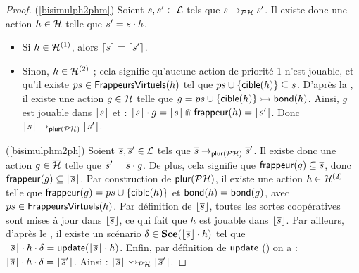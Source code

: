 \begin{proof}
  (\ref{bisimulph2phm}) Soient $s, s' \in \mathcal{L}$ tels que $s \rightarrow_{\mathcal{PH}} s'$.
    Il existe donc une action $h \in \mathcal{H}$ telle que $s' = s \cdot h$.
    \begin{itemize}
      \item Si $h \in \mathcal{H}^{(1)}$, alors $\lceil s \rceil = \lceil s' \rceil$.
      \item Sinon, $h \in \mathcal{H}^{(2)}$ ; cela signifie qu'aucune action de priorité 1 n'est
        jouable, et qu'il existe $ps \in \mathsf{FrappeursVirtuels}(h)$ tel que
        $ps \cup \{ \mathsf{cible}(h) \} \subseteq s$.
        D'après la , il existe une action $g \in \overline{\mathcal{H}}$
        telle que $g = \mbox{$ps \cup \{ \mathsf{cible}(h) \} \rightarrowtail \mathsf{bond}(h)$}$.
        Ainsi, $g$ est jouable dans $\lceil s \rceil$ et :
        $\lceil s \rceil \cdot g = \lceil s \rceil \Cap \mathsf{frappeur}(h) = \lceil s' \rceil$.
        Donc $\lceil s \rceil \rightarrow_{\mathsf{plur}(\mathcal{PH})} \lceil s' \rceil$.
    \end{itemize}
    
  (\ref{bisimulphm2ph}) Soient $\overline{s}, \overline{s}' \in \overline{\mathcal{L}}$ tels que $\overline{s} \rightarrow_{\mathsf{plur}(\mathcal{PH})} \overline{s}'$.
    Il existe donc une action $g \in \overline{\mathcal{H}}$ telle que $\overline{s}' = \overline{s} \cdot g$.
    De plus, cela signifie que $\mathsf{frappeur}(g) \subseteq \overline{s}$,
    donc $\mathsf{frappeur}(g) \subseteq \lfloor \overline{s} \rfloor$.
    Par construction de $\mathsf{plur}(\mathcal{PH})$, il existe une action $h \in \mathcal{H}^{(2)}$
    telle que $\mathsf{frappeur}(g) = ps \cup \{ \mathsf{cible}(h) \}$ et $\mathsf{bond}(h) = \mathsf{bond}(g)$,
    avec $ps \in \mathsf{FrappeursVirtuels}(h)$.
    Par définition de $\lfloor \overline{s} \rfloor$, toutes les sortes coopératives sont mises à jour
    dans $\lfloor \overline{s} \rfloor$, ce qui fait que $h$ est jouable dans $\lfloor \overline{s} \rfloor$.
    Par ailleurs, d'après le ,
    il existe un scénario $\delta \in \mathbf{Sce}(\lfloor \overline{s} \rfloor \cdot h)$
    tel que $\lfloor \overline{s} \rfloor \cdot h \cdot \delta = \mathsf{update}(\lfloor \overline{s} \rfloor \cdot h)$.
    Enfin, par définition de $\mathsf{update}$ ()
    on a : $\lfloor \overline{s} \rfloor \cdot h \cdot \delta = \lfloor \overline{s}' \rfloor$.
    Ainsi : $\lfloor \overline{s} \rfloor \rightsquigarrow_{\mathcal{PH}} \lfloor \overline{s}' \rfloor$.
\end{proof}

